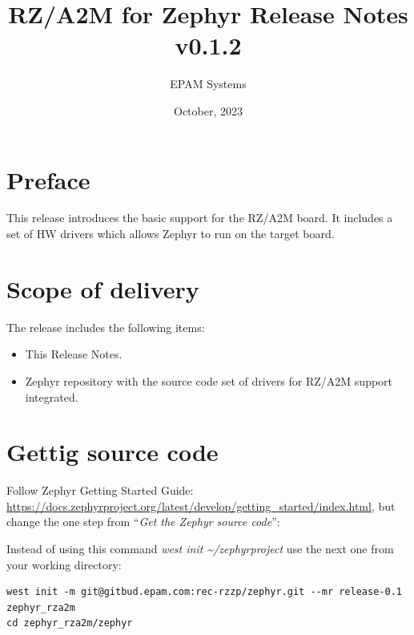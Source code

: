 \documentclass[11pt,a4paper,oneside]{article}
\begin{document}

\title{RZ/A2M for Zephyr Release Notes v0.1.2}
\author{EPAM Systems}
\date{October, 2023}

\maketitle

\tableofcontents

\clearpage

\section{Preface}\label{preface}

This release introduces the basic support for the RZ/A2M board. It
includes a set of HW drivers which allows Zephyr to run on the target
board.

\section{Scope of delivery}\label{scope-of-delivery}

The release includes the following items:

\begin{itemize}
\item This Release Notes.
\item Zephyr repository with the source code set of drivers for RZ/A2M support integrated.
\end{itemize}

\section{Gettig source code}\label{gettig-source-code}

Follow Zephyr Getting Started Guide:
\url{https://docs.zephyrproject.org/latest/develop/getting_started/index.html},
but change the one step from ``\emph{Get the Zephyr source code}'':

Instead of using this command \emph{west init
\textasciitilde/zephyrproject} use the next one from your working
directory:

\begin{lstlisting}
west init -m git@gitbud.epam.com:rec-rzzp/zephyr.git --mr release-0.1 zephyr_rza2m
cd zephyr_rza2m/zephyr
\end{lstlisting}
\end{document}
